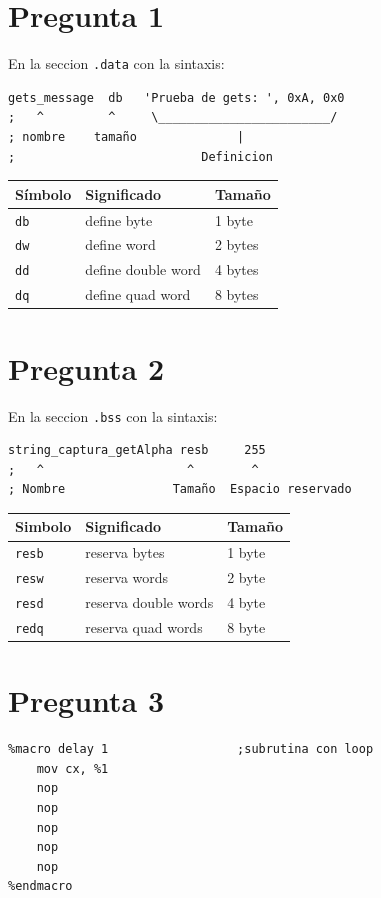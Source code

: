 \documentclass[10pt]{article}
\begin{document}
\section*{Pregunta 1}
\label{sec:orgca450a0}
En la seccion \texttt{.data} con la sintaxis:

\begin{verbatim}
gets_message  db   'Prueba de gets: ', 0xA, 0x0
;   ^         ^     \________________________/              
; nombre    tamaño              |
;                          Definicion   
\end{verbatim}

\begin{center}
\begin{tabular}{|l|l|l|}
\hline
Símbolo & Significado & Tamaño\\
\hline
\texttt{db} & define byte & 1 byte\\
\texttt{dw} & define word & 2 bytes\\
\texttt{dd} & define double word & 4 bytes\\
\texttt{dq} & define quad word & 8 bytes\\
\hline
\end{tabular}
\end{center}

\section*{Pregunta 2}
\label{sec:org59466aa}
En la seccion \texttt{.bss} con la sintaxis:
\begin{verbatim}
string_captura_getAlpha resb     255
;   ^                    ^        ^
; Nombre               Tamaño  Espacio reservado
\end{verbatim}

\begin{center}
\begin{tabular}{|l|l|l|}
\hline
Simbolo & Significado & Tamaño\\
\hline
\texttt{resb} & reserva bytes & 1 byte\\
\texttt{resw} & reserva words & 2 byte\\
\texttt{resd} & reserva double words & 4 byte\\
\texttt{redq} & reserva quad words & 8 byte\\
\hline
\end{tabular}
\end{center}

\section*{Pregunta 3}
\label{sec:org00f232a}
\begin{verbatim}
%macro delay 1                  ;subrutina con loop
    mov cx, %1
    nop
    nop
    nop
    nop
    nop	
%endmacro
\end{verbatim}
\end{document}
